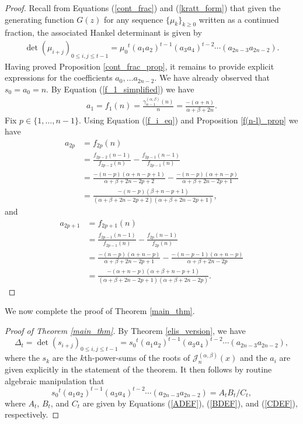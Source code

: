 \documentclass{amsart}
\theoremstyle{plain}
\theoremstyle{remark}
\begin{document}
\begin{proof}
Recall from Equations (\ref{cont_frac}) and (\ref{kratt_form}) that given the generating function $G(z)$ for any sequence $\lbrace \mu_k \rbrace_{k \geq 0}$ written as a continued fraction, the associated Hankel determinant is given by
\begin{align} \label{det_form_defn}
    \det(\mu_{i+j})_{0\le i,j\le t-1}={\mu_0}^t(a_1a_2)^{t-1}
   (a_3a_4)^{t-2}\cdots(a_{2n-3}a_{2n-2}).
\end{align}
Having proved Proposition \ref{cont_frac_prop}, it remains to provide explicit expressions for the coefficients $a_0,\ldots a_{2n-2}$.  We have already observed that $s_0 = a_0 = n$.  By  Equation (\ref{f_1_simplified}) we have
\begin{align*}
    a_1=f_1(n)=\frac{\gamma_{n-1}^{(\alpha,\beta)}(n)}{n}=\frac{-(\alpha+n)}{\alpha+\beta+2n}.
\end{align*}
Fix $p\in\{1,\ldots,n-1\}$. Using Equation (\ref{f_i_eq}) and Proposition \ref{f(n-l)_prop} we have
\begin{align*}
    a_{2p}&=f_{2p}(n)\\
    &=\frac{f_{2p-2}(n-1)}{f_{2p-2}(n)}-\frac{f_{2p-1}(n-1)}{f_{2p-1}(n)}\\
    &=\frac{-(n-p)(\alpha+n-p+1)}{\alpha+\beta+2n-2p+2}-\frac{-(n-p)(\alpha+n-p)}{\alpha+\beta+2n-2p+1}\\
    &=\frac{-(n-p)(\beta+n-p+1)}{(\alpha+\beta+2n-2p+2)(\alpha+\beta+2n-2p+1)},
\end{align*}
and
\begin{align*}
    a_{2p+1}&=f_{2p+1}(n)\\
    &=\frac{f_{2p-1}(n-1)}{f_{2p-1}(n)}-\frac{f_{2p}(n-1)}{f_{2p}(n)}\\
    &=\frac{-(n-p)(\alpha+n-p)}{\alpha+\beta+2n-2p+1}-\frac{-(n-p-1)(\alpha+n-p)}{\alpha+\beta+2n-2p}\\
    &=\frac{-(\alpha+n-p)(\alpha+\beta+n-p+1)}{(\alpha+\beta+2n-2p+1)(\alpha+\beta+2n-2p)}.
\end{align*}
\end{proof}

We now complete the proof of Theorem \ref{main_thm}.

\begin{proof}[Proof of Theorem \ref{main_thm}]
By Theorem \ref{elis_version}, we have
\[
\Delta_{t} = \det (s_{i+j})_{0 \leq i,j \leq t-1} = {s_0}^t(a_1a_2)^{t-1}(a_3a_4)^{t-2}\cdots(a_{2n-3}a_{2n-2}),
\]
where the $s_{k}$ are the $k$th-power-sums of the roots of $\mathscr{J}_n^{(\alpha,\beta)}(x)$ and the $a_i$ are given explicitly in the statement of the theorem.  It then follows by routine algebraic manipulation that 
\[
{s_0}^t(a_1a_2)^{t-1}(a_3a_4)^{t-2}\cdots(a_{2n-3}a_{2n-2}) = A_{t}B_{t}/C_{t},
\]
where $A_{t}$, $B_{t}$, and $C_{t}$ are given by Equations (\ref{ADEF}), (\ref{BDEF}), and (\ref{CDEF}), respectively.  
\end{proof}
\end{document}
